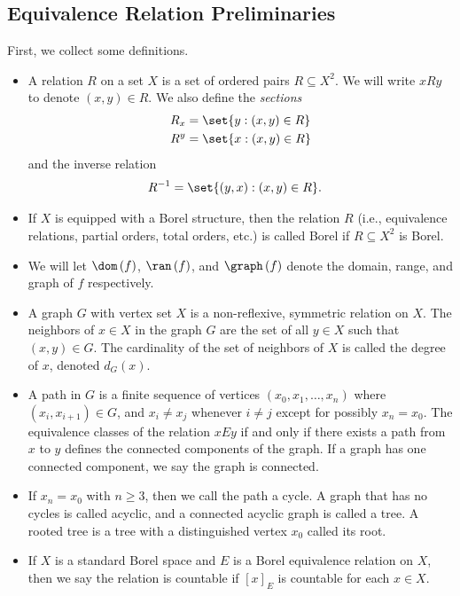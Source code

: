 \documentclass[10pt]{mypackage}
\begin{document}
\subsection{Equivalence Relation Preliminaries}%
First, we collect some definitions.
\begin{definition}\hfill
  \begin{itemize}
    \item A relation $R$ on a set $X$ is a set of ordered pairs $R\subseteq X^2$. We will write $xRy$ to denote $\left( x,y \right)\in R$. We also define the \textit{sections} 
      \begin{align*}
        R_x &= \set{y : \left( x,y \right)\in R}\\
        R^y &= \set{x : \left( x,y \right)\in R}
      \end{align*}
      and the inverse relation
      \begin{align*}
        R^{-1} &= \set{\left( y,x \right) : \left( x,y \right)\in R}.
      \end{align*}
    \item If $X$ is equipped with a Borel structure, then the relation $R$ (i.e., equivalence relations, partial orders, total orders, etc.) is called Borel if $R\subseteq X^2$ is Borel.
    \item We will let $\dom\left( f \right)$, $\ran\left( f \right)$, and $\graph\left( f \right)$ denote the domain, range, and graph of $f$ respectively.
    \item A graph $G$ with vertex set $X$ is a non-reflexive, symmetric relation on $X$. The neighbors of $x\in X$ in the graph $G$ are the set of all $y\in X$ such that $\left( x,y \right)\in G$. The cardinality of the set of neighbors of $X$ is called the degree of $x$, denoted $d_G(x)$.
    \item A path in $G$ is a finite sequence of vertices $\left( x_0,x_1,\dots, x_n \right)$ where $\left( x_i,x_{i+1} \right)\in G$, and $x_i\neq x_j$ whenever $i\neq j$ except for possibly $x_n = x_0$. The equivalence classes of the relation $xEy$ if and only if there exists a path from $x$ to $y$ defines the connected components of the graph. If a graph has one connected component, we say the graph is connected.
    \item If $x_n = x_0$ with $n\geq 3$, then we call the path a cycle. A graph that has no cycles is called acyclic, and a connected acyclic graph is called a tree. A rooted tree is a tree with a distinguished vertex $x_0$ called its root.
    \item If $X$ is a standard Borel space and $E$ is a Borel equivalence relation on $X$, then we say the relation is countable if $\left[ x \right]_E$ is countable for each $x\in X$.

\end{itemize}
\end{definition}
\end{document}
